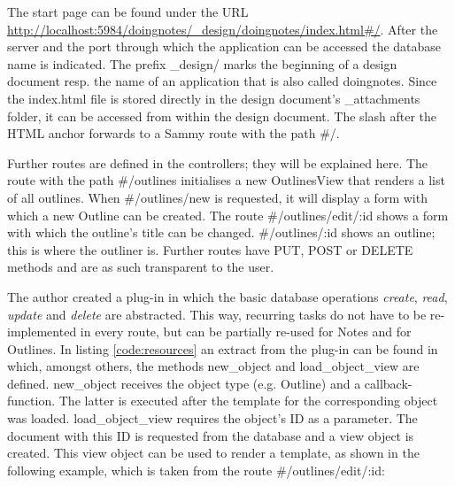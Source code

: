 The start page can be found under the URL \url{http://localhost:5984/doingnotes/_design/doingnotes/index.html#/}. After the server and the port through which the application can be accessed the database name is indicated. The prefix 
{\selectfont \_design/} marks the beginning of a design document resp. the name of an application that is also called {\selectfont doingnotes}. Since the {\selectfont index.html} file is stored directly in the design document's {\selectfont \_attachments} folder, it can be accessed from within the design document. The slash after the HTML anchor forwards to a Sammy route with the path {\selectfont\#/}.

Further routes are defined in the controllers; they will be explained here. The route with the path {\selectfont\#/outlines} initialises a new {\selectfont OutlinesView} that renders a list of all outlines. When {\selectfont\#/outlines/new} is requested, it will display a form with which a new {\selectfont Outline} can be created. The route {\selectfont\#/outlines/edit/:id} shows a form with which the outline's title can be changed. {\selectfont\#/outlines/:id} shows an outline; this is where the outliner is. Further routes have {\selectfont PUT}, {\selectfont POST} or {\selectfont DELETE} methods and are as such transparent to the user.

The author created a plug-in in which the basic database operations \textit{create}, \textit{read}, \textit{update} and \textit{delete} are abstracted. This way, recurring tasks do not have to be re-implemented in every route, but can be partially re-used for {\selectfont Notes} and for {\selectfont Outlines}. In listing \ref{code:resources} an extract from the plug-in can be found in which, amongst others, the methods {\selectfont new\_object} and {\selectfont load\_object\_view} are defined. {\selectfont new\_object} receives the object type (e.g. {\selectfont Outline}) and a callback-function. The latter is executed after the template for the corresponding object was loaded. {\selectfont load\_object\_view} requires the object's ID as a parameter. The document with this ID is requested from the database and a view object is created. This view object can be used to render a template, as shown in the following example, which is taken from the route {\selectfont\#/outlines/edit/:id}:

